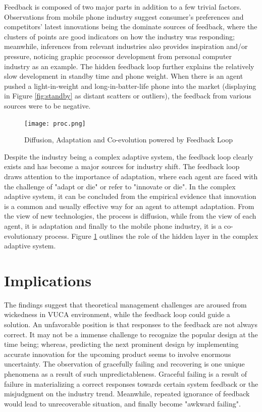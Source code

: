 \documentclass[utf8,english]{gradu3}
\begin{document}
Feedback is composed of two major parts in addition to a few trivial factors. Observations from mobile phone industry suggest consumer's preferences and competitors' latest innovations being the dominate sources of feedback, where the clusters of points are good indicators on how the industry was responding; meanwhile, inferences from relevant industries also provides inspiration and/or pressure, noticing graphic processor development from personal computer industry as an example. The hidden feedback loop further explains the relatively slow development in standby time and phone weight. When there is an agent pushed a light-in-weight and long-in-batter-life phone into the market (displaying in Figure \ref{fig:standby} as distant scatters or outliers), the feedback from various sources were to be negative. 

\begin{figure}[htb]
    \centering
    \texttt{[image: proc.png]}
    \caption{Diffusion, Adaptation and Co-evolution powered by Feedback Loop}
    \label{fig:proc}
\end{figure}

Despite the industry being a complex adaptive system, the feedback loop clearly exists and has become a major sources for industry shift. The feedback loop draws attention to the importance of adaptation, where each agent are faced with the challenge of "adapt or die" or refer to "innovate or die". In the complex adaptive system, it can be concluded from the empirical evidence that innovation is a common and usually effective way for an agent to attempt adaptation. From the view of new technologies, the process is diffusion, while from the view of each agent, it is adaptation and finally to the mobile phone industry, it is a co-evolutionary process. Figure \ref{fig:proc} outlines the role of the hidden layer in the complex adaptive system.

\chapter{Implications}

The findings suggest that theoretical management challenges are aroused from wickedness in VUCA environment, while the feedback loop could guide a solution. An unfavorable position is that responses to the feedback are not always correct. It may not be a immense challenge to recognize the popular design at the time being; whereas, predicting the next prominent design by implementing accurate innovation for the upcoming product seems to involve enormous uncertainty. The observation of gracefully failing and recovering is one unique phenomena as a result of such unpredictableness. Graceful failing is a result of failure in materializing a correct responses towards certain system feedback or the misjudgment on the industry trend. Meanwhile, repeated ignorance of feedback would lead to unrecoverable situation, and finally become "awkward failing".
\end{document}

